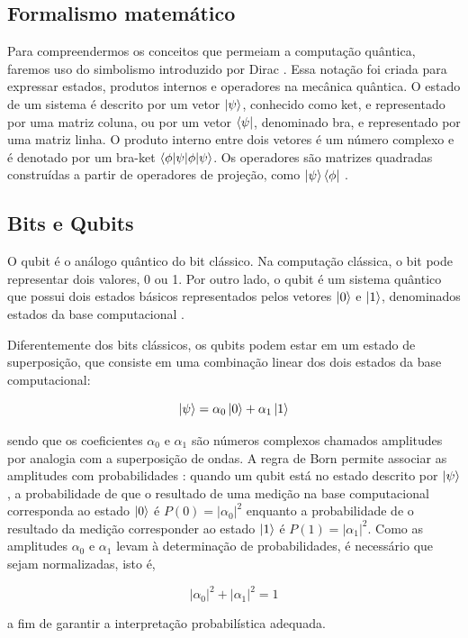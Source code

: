\subsection{Formalismo matemático} \label{formalismo}

Para compreendermos os conceitos que permeiam a computação quântica, faremos uso do simbolismo introduzido por Dirac \cite{Dirac}. Essa notação foi criada para expressar estados, produtos internos e operadores na mecânica quântica. O estado de um sistema é descrito por um vetor $\ket{\psi}$, conhecido como ket, e representado por uma matriz coluna, ou por um vetor $\bra{\psi}$, denominado bra, e representado por uma matriz linha. O produto interno entre dois vetores é um número complexo e é denotado por um bra-ket $\braket{\phi | \psi}$. Os operadores são matrizes quadradas construídas a partir de operadores de projeção, como $\ket{\psi}\bra{\phi}$ \cite{Dirac,Mermin2007QComputerScience,Zubairy2020,Wong2022IntroductionClassicalQuantum}.

\subsection{Bits e Qubits} \label{Qubits}

O qubit é o análogo quântico do bit clássico. Na computação clássica, o bit pode representar dois valores, 0 ou 1. Por outro lado, o qubit é um sistema quântico que possui dois estados básicos representados pelos vetores $\ket{0}$ e $\ket{1}$, denominados estados da base computacional \cite{Nielsen,Mermin2007QComputerScience}.

Diferentemente dos bits clássicos, os qubits podem estar em um estado de superposição, que consiste em uma combinação linear dos dois estados da base computacional:
%
%
\begin{center}
\begin{equation}
\ket{\psi} = \alpha_0\ket{0} + \alpha_1\ket{1} 
\end{equation}
\end{center}
%
%
\noindent sendo que os coeficientes $\alpha_0$ e $\alpha_1$ são números complexos chamados amplitudes por analogia com a superposição de ondas. A regra de Born permite associar as amplitudes com probabilidades \cite{Dirac,Nielsen,Mermin2007QComputerScience,Zubairy2020,Wong2022IntroductionClassicalQuantum}: quando um qubit está no estado descrito por $\ket{\psi}$, a probabilidade de que o resultado de uma medição na base computacional corresponda ao estado $\ket{0}$ é $P(0)=|\alpha_0|^2$ enquanto a probabilidade de o resultado da medição corresponder ao estado $\ket{1}$ é $P(1)=|\alpha_1|^2$. Como as amplitudes $\alpha_0$ e $\alpha_1$ levam à determinação de probabilidades, é necessário que sejam normalizadas, isto é, 
%
%
\begin{center}
\begin{equation}
 |\alpha_0|^2 + |\alpha_1|^2 = 1 
\end{equation}
\end{center}
%
%
\noindent a fim de garantir a interpretação probabilística adequada.

